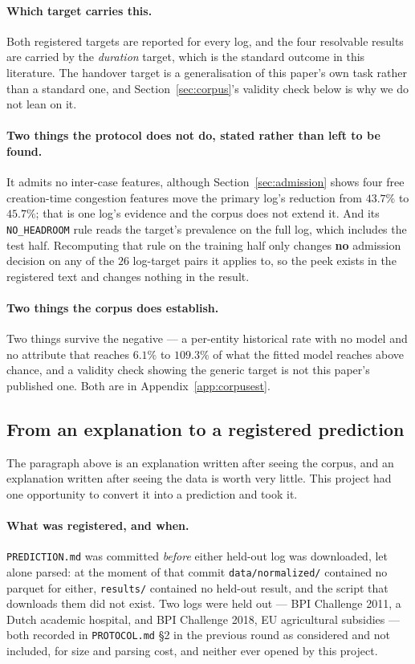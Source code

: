 \documentclass[preprint,12pt]{elsarticle}
\begin{document}
\paragraph{Which target carries this.}
Both registered targets are reported for every log, and the four resolvable
results are carried by the \emph{duration} target, which is the standard
outcome in this literature. The handover target is a generalisation of this
paper's own task rather than a standard one, and Section~\ref{sec:corpus}'s
validity check below is why we do not lean on it.

\paragraph{Two things the protocol does not do, stated rather than left to be
found.}
It admits no inter-case features, although Section~\ref{sec:admission} shows
four free creation-time congestion features move the primary log's reduction
from $43.7\%$ to $45.7\%$; that is one log's evidence and the corpus does not
extend it. And its \texttt{NO\_HEADROOM} rule reads the target's prevalence on
the full log, which includes the test half. Recomputing that rule on the
training half only changes \textbf{no} admission decision on any of the $26$
log-target pairs it applies to, so the peek exists in the registered text and
changes nothing in the result.

\paragraph{Two things the corpus does establish.}
Two things survive the negative --- a per-entity historical rate with no model and no attribute that reaches $6.1\%$ to $109.3\%$ of what the fitted model reaches above chance, and a validity check showing the generic target is not this paper's published one. Both are in Appendix~\ref{app:corpusest}.

\subsection{From an explanation to a registered prediction}
\label{sec:prediction}

The paragraph above is an explanation written after seeing the corpus, and an
explanation written after seeing the data is worth very little. This project
had one opportunity to convert it into a prediction and took it.

\paragraph{What was registered, and when.} \texttt{PREDICTION.md} was
committed \emph{before} either held-out log was downloaded, let alone parsed:
at the moment of that commit \texttt{data/normalized/} contained no parquet
for either, \texttt{results/} contained no held-out result, and the script
that downloads them did not exist. Two logs were held out --- BPI Challenge
2011, a Dutch academic hospital, and BPI Challenge 2018, EU agricultural
subsidies --- both recorded in \texttt{PROTOCOL.md} \S2 in the previous round
as considered and not included, for size and parsing cost, and neither ever
opened by this project.
\end{document}
